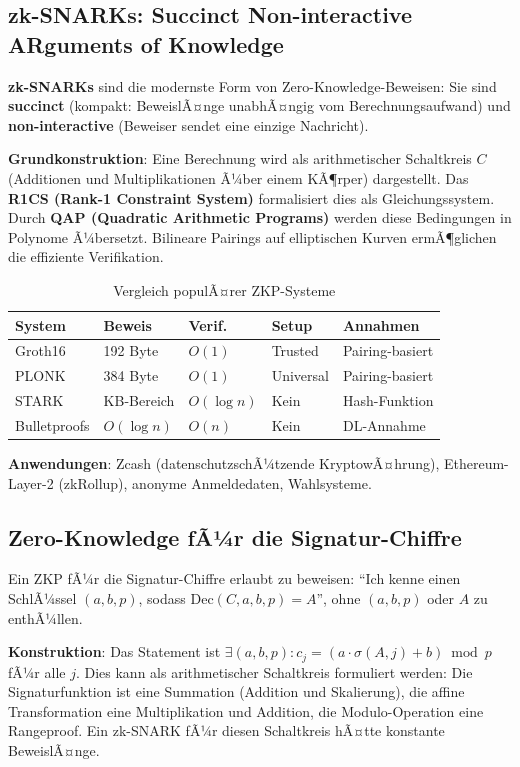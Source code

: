 ﻿\documentclass[a4paper,12pt]{scrreprt}
\theoremstyle{definition}
\begin{document}
\subsection{zk-SNARKs: Succinct Non-interactive ARguments of Knowledge}

\textbf{zk-SNARKs} \cite{GGPR13} sind die modernste Form von Zero-Knowledge-Beweisen: Sie sind \textbf{succinct} (kompakt: BeweislÃ¤nge unabhÃ¤ngig vom Berechnungsaufwand) und \textbf{non-interactive} (Beweiser sendet eine einzige Nachricht).

\textbf{Grundkonstruktion}: Eine Berechnung wird als arithmetischer Schaltkreis $C$ (Additionen und Multiplikationen Ã¼ber einem KÃ¶rper) dargestellt. Das \textbf{R1CS (Rank-1 Constraint System)} formalisiert dies als Gleichungssystem. Durch \textbf{QAP (Quadratic Arithmetic Programs)} \cite{GGPR13} werden diese Bedingungen in Polynome Ã¼bersetzt. Bilineare Pairings auf elliptischen Kurven ermÃ¶glichen die effiziente Verifikation.

\begin{table}[ht]
\centering
\caption{Vergleich populÃ¤rer ZKP-Systeme}
\begin{tabular}{@{}lllll@{}}
\toprule
\textbf{System} & \textbf{Beweis} & \textbf{Verif.} & \textbf{Setup} & \textbf{Annahmen} \\
\midrule
Groth16 & 192 Byte & $O(1)$ & Trusted & Pairing-basiert \\
PLONK & 384 Byte & $O(1)$ & Universal & Pairing-basiert \\
STARK & KB-Bereich & $O(\log n)$ & Kein & Hash-Funktion \\
Bulletproofs & $O(\log n)$ & $O(n)$ & Kein & DL-Annahme \\
\bottomrule
\end{tabular}
\end{table}

\textbf{Anwendungen}: Zcash (datenschutzschÃ¼tzende KryptowÃ¤hrung), Ethereum-Layer-2 (zkRollup), anonyme Anmeldedaten, Wahlsysteme.

\subsection{Zero-Knowledge fÃ¼r die Signatur-Chiffre}

Ein ZKP fÃ¼r die Signatur-Chiffre erlaubt zu beweisen: ``Ich kenne einen SchlÃ¼ssel $(a,b,p)$, sodass $\mathrm{Dec}(C, a,b,p) = A$'', ohne $(a,b,p)$ oder $A$ zu enthÃ¼llen.

\textbf{Konstruktion}: Das Statement ist $\exists (a,b,p) : c_j = (a \cdot \sigma(A,j) + b) \bmod p$ fÃ¼r alle $j$. Dies kann als arithmetischer Schaltkreis formuliert werden: Die Signaturfunktion ist eine Summation (Addition und Skalierung), die affine Transformation eine Multiplikation und Addition, die Modulo-Operation eine Rangeproof. Ein zk-SNARK \cite{GGPR13} fÃ¼r diesen Schaltkreis hÃ¤tte konstante BeweislÃ¤nge.
\end{document}
